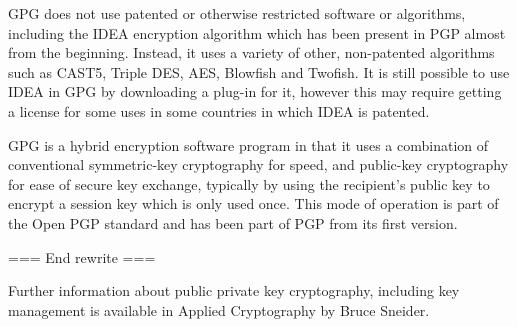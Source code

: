 GPG does not use patented or otherwise restricted software or
algorithms, including the IDEA encryption algorithm which has been
present in PGP almost from the beginning. Instead, it uses a variety of
other, non-patented algorithms such as CAST5, Triple DES, AES, Blowfish
and Twofish. It is still possible to use IDEA in GPG by downloading a
plug-in for it, however this may require getting a license for some uses
in some countries in which IDEA is patented.

GPG is a hybrid encryption software program in that it uses a
combination of conventional symmetric-key cryptography for speed, and
public-key cryptography for ease of secure key exchange, typically by
using the recipient's public key to encrypt a session key which is only
used once. This mode of operation is part of the Open PGP standard and
has been part of PGP from its first version.

=== End rewrite ===

Further information about public private key cryptography, including key
management is available in Applied Cryptography by Bruce Sneider.
